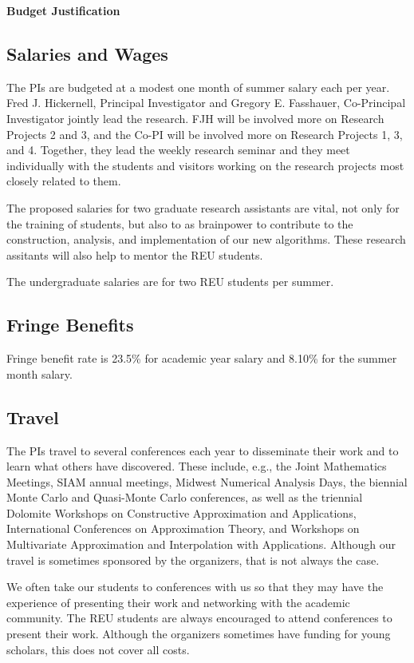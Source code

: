 \documentclass[11pt]{NSFamsart}
\begin{document}

\centerline{\textbf{\Large Budget Justification}}

\subsection*{Salaries and Wages}

The PIs are budgeted at a modest one month of summer salary each per year.  Fred J. Hickernell, Principal Investigator and Gregory E. Fasshauer, Co-Principal Investigator jointly lead the research.  FJH will be involved more on Research Projects 2 and 3, and the Co-PI will be involved more on Research Projects 1, 3, and 4.  Together, they lead the weekly research seminar and they meet individually with the students and visitors working on the research projects most closely related to them.

The proposed salaries for two graduate research assistants are vital, not only for the training of students, but also to as brainpower to contribute to the construction, analysis, and implementation of our new algorithms.  These research assitants will also help to mentor the REU students.

The undergraduate salaries are for two REU students per summer.

\subsection*{Fringe Benefits}
Fringe benefit rate is 23.5\% for academic year salary and 8.10\% for the summer month
salary.

\subsection*{Travel}
The PIs travel to several conferences each year to disseminate their work and to learn what others have discovered.  These include, e.g., the Joint Mathematics Meetings, SIAM annual meetings, Midwest Numerical Analysis Days, the biennial Monte Carlo and Quasi-Monte Carlo conferences, as well as the triennial Dolomite Workshops on Constructive Approximation and Applications, International Conferences on Approximation Theory, and Workshops on Multivariate Approximation and Interpolation with Applications. Although our travel is sometimes sponsored by the organizers, that is not always the case.

We often take our students to conferences with us so that they may have the experience of presenting their work and networking with the academic community.  The REU students are always encouraged to attend conferences to present their work.  Although the organizers sometimes have funding for young scholars, this does not cover all costs.
\end{document}
